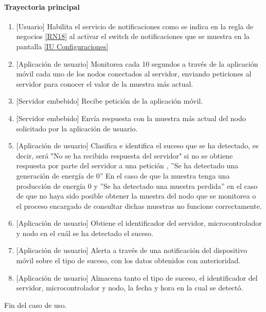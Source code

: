 \paragraph{Trayectoria principal}
	\begin{enumerate}
		\item {[Usuario]} Habilita el servicio de notificaciones como se indica en la regla de negocios \ref{RN18} al activar el switch de notificaciones que se muestra en la pantalla \hyperref[fig:Configuraciones]{[IU Configuraciones]} 
        \item {[Aplicación de usuario]} Monitorea cada 10 segundos a través de la aplicación móvil cada uno de los nodos conectados al servidor, enviando peticiones al servidor para conocer el valor de la muestra más actual.
        \item {[Servidor embebido]} Recibe petición de la aplicación móvil.
        \item {[Servidor embebido]} Envía respuesta con la muestra más actual del nodo solicitado por la aplicación de usuario.
		\item {[Aplicación de usuario]} Clasifica e identifica el suceso que se ha detectado, es decir, será "No se ha recibido respuesta del servidor" si no se obtiene respuesta por parte del servidor a una petición , ''Se ha detectado una generación de energía de 0'' En el caso de que la muestra tenga una producción de energía 0 y ''Se ha detectado una muestra perdida'' en el caso de que no haya sido posible obtener la muestra del nodo que se monitorea o el proceso encargado de consultar dichas muestras no funcione correctamente. 
		\item {[Aplicación de usuario]} Obtiene el identificador del servidor, microcontrolador y nodo en el cuál se ha detectado el suceso.
		\item {[Aplicación de usuario]} Alerta a través de una notificación del dispositivo móvil sobre el tipo de suceso, con los datos obtenidos con anterioridad.
		\item {[Aplicación de usuario]} Almacena tanto el tipo de suceso, el identificador del servidor, microcontrolador y nodo, la fecha y hora en la cual se detectó.
	\end{enumerate}
	Fin del caso de uso.

